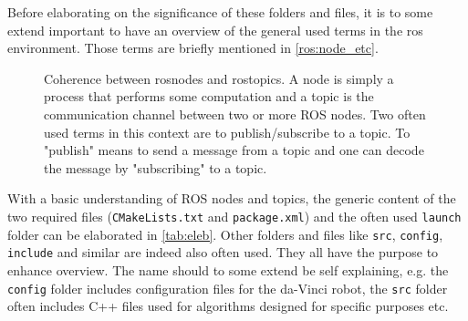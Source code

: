 \begin{comment}
:Title: Simple graph
:Tags: Arrows;Diagrams;Graphs;Mathematics
:Author: Stefan Kottwitz
:Slug: graph

A simple example of a graph with straight and bend arrows and loops.
It has been posted as answer to the question
http://tex.stackexchange.com/q/45734/213 of Ichibann.

* Define styles for edges, arrows, and nodes
* Place the main nodes
* Draw edges with nodes for description
* Use options `loop` and `bend` for loops and bent edges
* Specify `left` and `right` for bend direction and node placement
\end{comment}

Before elaborating on the significance of these folders and files, it is to some extend important to have an overview of the general used terms in the \gls{ros} environment. Those terms are briefly mentioned in \autoref{ros:node_etc}. 
\begin{figure}[H]
\center
{}
\caption{Coherence between rosnodes and rostopics. A node is simply a process that performs some computation and a topic is the communication channel between two or more ROS nodes. Two often used terms in this context are to publish/subscribe to a topic. To "publish" means to send a message from a topic and one can decode the message by "subscribing" to a topic.}
\label{ros:node_etc}
\end{figure}
With a basic understanding of ROS nodes and topics, the generic content of the two required files (\texttt{CMakeLists.txt} and \texttt{package.xml}) and the often used \texttt{launch} folder can be elaborated in \autoref{tab:eleb}. Other folders and files like \texttt{src}, \texttt{config}, \texttt{include} and similar are indeed also often used. They all have the purpose to enhance overview. The name should to some extend be self explaining, e.g. the \texttt{config} folder includes configuration files for the da-Vinci robot, the \texttt{src} folder often includes C++ files used for algorithms designed for specific purposes etc.
